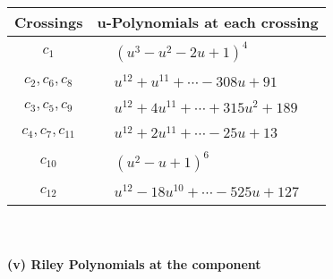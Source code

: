 \documentclass[1p]{elsarticle_modified}
\theoremstyle{definition}
\begin{document}
\begin{tabular}{m{50pt}|m{274pt}}
Crossings & \hspace{64pt}u-Polynomials at each crossing \\
\hline $$\begin{aligned}c_{1}\end{aligned}$$&$\begin{aligned}
&(u^3- u^2-2 u+1)^4
\end{aligned}$\\
\hline $$\begin{aligned}c_{2},c_{6},c_{8}\end{aligned}$$&$\begin{aligned}
&u^{12}+u^{11}+\cdots-308 u+91
\end{aligned}$\\
\hline $$\begin{aligned}c_{3},c_{5},c_{9}\end{aligned}$$&$\begin{aligned}
&u^{12}+4 u^{11}+\cdots+315 u^2+189
\end{aligned}$\\
\hline $$\begin{aligned}c_{4},c_{7},c_{11}\end{aligned}$$&$\begin{aligned}
&u^{12}+2 u^{11}+\cdots-25 u+13
\end{aligned}$\\
\hline $$\begin{aligned}c_{10}\end{aligned}$$&$\begin{aligned}
&(u^2- u+1)^6
\end{aligned}$\\
\hline $$\begin{aligned}c_{12}\end{aligned}$$&$\begin{aligned}
&u^{12}-18 u^{10}+\cdots-525 u+127
\end{aligned}$\\
\hline
\end{tabular}\\~\\
\newpage\renewcommand{\arraystretch}{1}
\flushleft \textbf{(v) Riley Polynomials at the component}\newline \\
\end{document}
